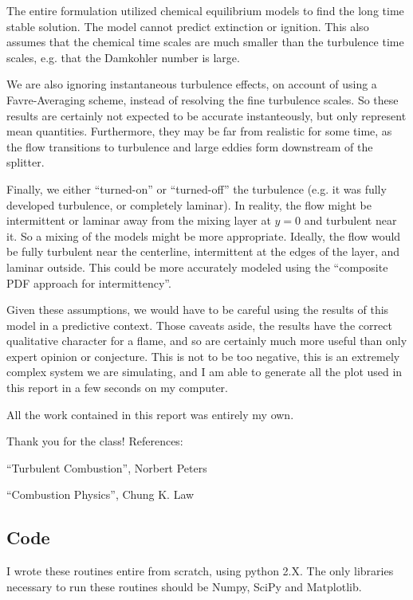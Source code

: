 \documentclass{article}
\begin{document}
The entire formulation utilized chemical
equilibrium models to find the long time stable solution. The model
cannot predict extinction or ignition. This also assumes that the
chemical time scales are much smaller than the turbulence time scales,
e.g. that the Damkohler number is large. 

We are also ignoring instantaneous turbulence effects, on account of
using a Favre-Averaging scheme, instead of resolving the fine turbulence
scales. So these results are certainly not expected to be accurate
instanteously, but only represent mean quantities. Furthermore, they may
be far from realistic for some time, as the flow transitions to
turbulence and large eddies form downstream of the splitter.  

Finally, we either ``turned-on'' or ``turned-off'' the turbulence
(e.g. it was fully developed turbulence, or completely laminar). In
reality, the flow might be intermittent or laminar away from the mixing
layer at $y=0$ and turbulent near it. So a mixing of the models might be
more appropriate. Ideally, the flow would be fully turbulent near the
centerline, intermittent at the edges of the layer, and laminar
outside. This could be more accurately modeled using the ``composite PDF
approach for intermittency''. 

Given these assumptions, we would have to be careful using the results
of this model in a predictive context. Those caveats aside, the results
have the correct qualitative character for a flame, and so are certainly
much more useful than only expert opinion or conjecture. This is not to be too
negative, this is an extremely complex system we are simulating, and I
am able to generate all the plot used in this report in a few seconds on
my computer. 


\newpage
All the work contained in this report was entirely my own. 

Thank you for the class! 
\vspace{1in}
\newline
References:

``Turbulent Combustion'', Norbert Peters

``Combustion Physics'', Chung K. Law


\subsection*{Code}
I wrote these routines entire from scratch, using python 2.X. The only
libraries necessary to run these routines should be Numpy, SciPy and
Matplotlib.  

\end{document}
